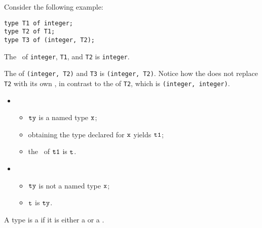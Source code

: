 Consider the following example:
\begin{lstlisting}
type T1 of integer;
type T2 of T1;
type T3 of (integer, T2);
\end{lstlisting}

The \underlyingtypes\ of \texttt{integer}, \texttt{T1}, and \texttt{T2} is \texttt{integer}.

The \underlyingtype{} of \texttt{(integer, T2)} and \texttt{T3} is
\texttt{(integer, T2)}.  Notice how the \underlyingtype{} does not replace
\texttt{T2} with its own \underlyingtype, in contrast to the \structure{} of
\texttt{T2}, which is \texttt{(integer, integer)}.

\ProseParagraph
\OneApplies
\begin{itemize}
  \item {}
  \begin{itemize}
    \item $\texttt{ty}$ is a named type $\texttt{x}$;
    \item obtaining the type declared for $\texttt{x}$ yields $\texttt{t1}$\ProseOrTypeError;
    \item the \underlyingtype\ of $\texttt{t1}$ is $\texttt{t}$.
  \end{itemize}

  \item {}
  \begin{itemize}
    \item $\texttt{ty}$ is not a named type $\texttt{x}$;
    \item $\texttt{t}$ is $\texttt{ty}$.
  \end{itemize}
\end{itemize}

\FormallyParagraph
{}

A type is a \emph{\constrainedinteger} if it is either a \wellconstrainedintegertype{}
or a \parameterizedintegertype.

